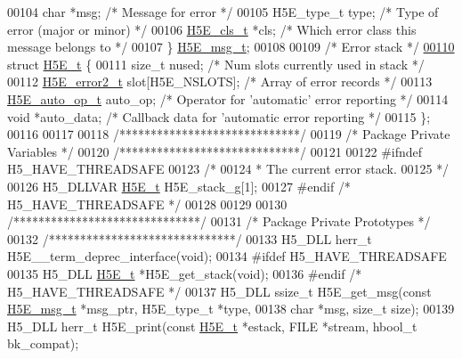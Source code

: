 \begin{DoxyCode}
00104     \textcolor{keywordtype}{char}        *msg;           \textcolor{comment}{/* Message for error */}
00105     H5E\_type\_t   type;          \textcolor{comment}{/* Type of error (major or minor) */}
00106     \hyperlink{struct_h5_e__cls__t}{H5E\_cls\_t}   *cls;           \textcolor{comment}{/* Which error class this message belongs to */}
00107 \} \hyperlink{struct_h5_e__msg__t}{H5E\_msg\_t};
00108 
00109 \textcolor{comment}{/* Error stack */}
\hyperlink{struct_h5_e__t}{00110} \textcolor{keyword}{struct }\hyperlink{struct_h5_e__t}{H5E\_t} \{
00111     \textcolor{keywordtype}{size\_t} nused;               \textcolor{comment}{/* Num slots currently used in stack  */}
00112     \hyperlink{struct_h5_e__error2__t}{H5E\_error2\_t} slot[H5E\_NSLOTS];  \textcolor{comment}{/* Array of error records        */}
00113     \hyperlink{struct_h5_e__auto__op__t}{H5E\_auto\_op\_t} auto\_op;              \textcolor{comment}{/* Operator for 'automatic' error reporting */}
00114     \textcolor{keywordtype}{void} *auto\_data;                    \textcolor{comment}{/* Callback data for 'automatic error reporting */}
00115 \};
00116 
00117 
00118 \textcolor{comment}{/*****************************/}
00119 \textcolor{comment}{/* Package Private Variables */}
00120 \textcolor{comment}{/*****************************/}
00121 
00122 \textcolor{preprocessor}{#ifndef H5\_HAVE\_THREADSAFE}
00123 \textcolor{comment}{/*}
00124 \textcolor{comment}{ * The current error stack.}
00125 \textcolor{comment}{ */}
00126 H5\_DLLVAR \hyperlink{struct_h5_e__t}{H5E\_t}    H5E\_stack\_g[1];
00127 \textcolor{preprocessor}{#endif }\textcolor{comment}{/* H5\_HAVE\_THREADSAFE */}\textcolor{preprocessor}{}
00128 
00129 
00130 \textcolor{comment}{/******************************/}
00131 \textcolor{comment}{/* Package Private Prototypes */}
00132 \textcolor{comment}{/******************************/}
00133 H5\_DLL herr\_t H5E\_\_term\_deprec\_interface(\textcolor{keywordtype}{void});
00134 \textcolor{preprocessor}{#ifdef H5\_HAVE\_THREADSAFE}
00135 H5\_DLL \hyperlink{struct_h5_e__t}{H5E\_t} *H5E\_get\_stack(\textcolor{keywordtype}{void});
00136 \textcolor{preprocessor}{#endif }\textcolor{comment}{/* H5\_HAVE\_THREADSAFE */}\textcolor{preprocessor}{}
00137 H5\_DLL ssize\_t H5E\_get\_msg(\textcolor{keyword}{const} \hyperlink{struct_h5_e__msg__t}{H5E\_msg\_t} *msg\_ptr, H5E\_type\_t *type,
00138     \textcolor{keywordtype}{char} *msg, \textcolor{keywordtype}{size\_t} size);
00139 H5\_DLL herr\_t H5E\_print(\textcolor{keyword}{const} \hyperlink{struct_h5_e__t}{H5E\_t} *estack, FILE *stream, hbool\_t bk\_compat);

\end{DoxyCode}
